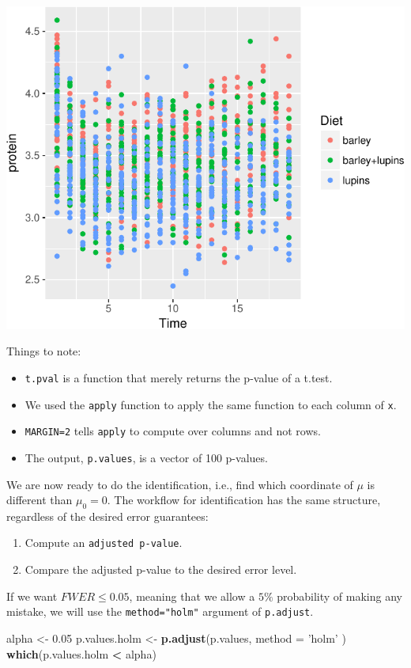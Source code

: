 \documentclass[]{book}
\newenvironment{Shaded}{\begin{snugshade}}{\end{snugshade}}
\newcommand{\KeywordTok}[1]{\textcolor[rgb]{0.13,0.29,0.53}{\textbf{#1}}}
\newcommand{\DataTypeTok}[1]{\textcolor[rgb]{0.13,0.29,0.53}{#1}}
\newcommand{\FloatTok}[1]{\textcolor[rgb]{0.00,0.00,0.81}{#1}}
\newcommand{\StringTok}[1]{\textcolor[rgb]{0.31,0.60,0.02}{#1}}
\newcommand{\OperatorTok}[1]{\textcolor[rgb]{0.81,0.36,0.00}{\textbf{#1}}}
\newcommand{\NormalTok}[1]{#1}
\providecommand{\tightlist}{%
  \setlength{\itemsep}{0pt}\setlength{\parskip}{0pt}}
\theoremstyle{definition}
\theoremstyle{definition}
\theoremstyle{definition}
\theoremstyle{remark}
\begin{document}
\includegraphics[width=0.5\linewidth]{Rcourse_files/figure-latex/unnamed-chunk-230-1}

Things to note:

\begin{itemize}
\tightlist
\item
  \texttt{t.pval} is a function that merely returns the p-value of a
  t.test.
\item
  We used the \texttt{apply} function to apply the same function to each
  column of \texttt{x}.
\item
  \texttt{MARGIN=2} tells \texttt{apply} to compute over columns and not
  rows.
\item
  The output, \texttt{p.values}, is a vector of 100 p-values.
\end{itemize}

We are now ready to do the identification, i.e., find which coordinate
of \(\mu\) is different than \(\mu_0=0\). The workflow for
identification has the same structure, regardless of the desired error
guarantees:

\begin{enumerate}
\def\labelenumi{\arabic{enumi}.}
\tightlist
\item
  Compute an \texttt{adjusted\ p-value}.
\item
  Compare the adjusted p-value to the desired error level.
\end{enumerate}

If we want \(FWER \leq 0.05\), meaning that we allow a \(5\%\)
probability of making any mistake, we will use the
\texttt{method="holm"} argument of \texttt{p.adjust}.

\begin{Shaded}
\begin{Highlighting}[]
\NormalTok{alpha <-}\StringTok{ }\FloatTok{0.05}
\NormalTok{p.values.holm <-}\StringTok{ }\KeywordTok{p.adjust}\NormalTok{(p.values, }\DataTypeTok{method =} \StringTok{'holm'}\NormalTok{ )}
\KeywordTok{which}\NormalTok{(p.values.holm }\OperatorTok{<}\StringTok{ }\NormalTok{alpha)}
\end{Highlighting}
\end{Shaded}
\end{document}
